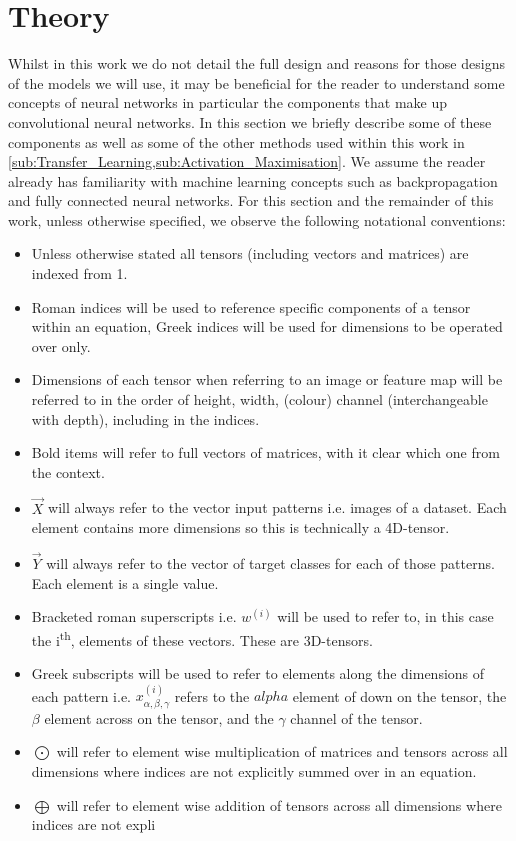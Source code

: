 \documentclass[12pt]{article}
\numberwithin{equation}{section}
\numberwithin{figure}{section}
\begin{document}
\section{Theory} 
\label{sec:Theory} 
Whilst in this work we do not detail the full design and reasons for those designs of the models we will use, it may be beneficial for the reader to understand some concepts of neural networks in particular the components that make up convolutional neural networks. In this section we briefly describe some of these components as well as some of the other methods used within this work in \cref{sub:Transfer_Learning,sub:Activation_Maximisation}. We assume the reader already has familiarity with machine learning concepts such as backpropagation and fully connected neural networks. For this section and the remainder of this work, unless otherwise specified, we observe the following notational conventions:
\begin{itemize}
	\item Unless otherwise stated all tensors (including vectors and matrices) are indexed from 1.
	\item Roman indices will be used to reference specific components of a tensor within an equation, Greek indices will be used for dimensions to be operated over only.
	\item Dimensions of each tensor when referring to an image or feature map will be referred to in the order of height, width, (colour) channel (interchangeable with depth), including in the indices.
	\item Bold items will refer to full vectors of matrices, with it clear which one from the context.
	\item $\vec{X}$ will always refer to the vector input patterns i.e. images of a dataset. Each element contains more dimensions so this is technically a 4D-tensor.
	\item $\vec{Y}$ will always refer to the vector of target classes for each of those patterns. Each element is a single value.
	\item Bracketed roman superscripts i.e. $w^{(i)}$ will be used to refer to, in this case the i\textsuperscript{th}, elements of these vectors. These are 3D-tensors.
	
	\item Greek subscripts will be used to refer to elements along the dimensions of each pattern i.e. $x^{(i)}_{\alpha, \beta, \gamma}$ refers to the $alpha$ element of down on the tensor, the $\beta$ element across on the tensor, and the $\gamma$ channel of the tensor.
	\item $\bigodot$ will refer to element wise multiplication of matrices and tensors across all dimensions where indices are not explicitly summed over in an equation.
	\item $\bigoplus$ will refer to element wise addition of tensors across all dimensions where indices are not expli
\end{itemize}
\end{document}
